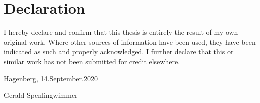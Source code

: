 
\chapter*{Declaration}
\noindent
I hereby declare and confirm that this thesis is entirely the result of my own original work. 
Where other sources of information have been used, they have been indicated as such and properly 
acknowledged. I further declare that this or similar work has not been submitted for credit elsewhere.
\par
\vspace{10mm}
\noindent
Hagenberg, 14.September.2020
\par
\vspace{12mm}
\noindent
Gerald Spenlingwimmer